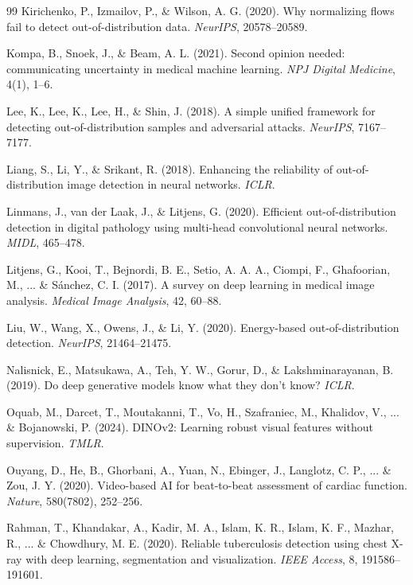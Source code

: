 \documentclass[11pt,a4paper]{article}
\begin{document}
\begin{thebibliography}{99}
Kirichenko, P., Izmailov, P., \& Wilson, A. G. (2020).
Why normalizing flows fail to detect out-of-distribution data.
\textit{NeurIPS}, 20578--20589.

Kompa, B., Snoek, J., \& Beam, A. L. (2021).
Second opinion needed: communicating uncertainty in medical machine learning.
\textit{NPJ Digital Medicine}, 4(1), 1--6.

Lee, K., Lee, K., Lee, H., \& Shin, J. (2018).
A simple unified framework for detecting out-of-distribution samples and adversarial attacks.
\textit{NeurIPS}, 7167--7177.

Liang, S., Li, Y., \& Srikant, R. (2018).
Enhancing the reliability of out-of-distribution image detection in neural networks.
\textit{ICLR}.

Linmans, J., van der Laak, J., \& Litjens, G. (2020).
Efficient out-of-distribution detection in digital pathology using multi-head convolutional neural networks.
\textit{MIDL}, 465--478.

Litjens, G., Kooi, T., Bejnordi, B. E., Setio, A. A. A., Ciompi, F., Ghafoorian, M., ... \& S\'{a}nchez, C. I. (2017).
A survey on deep learning in medical image analysis.
\textit{Medical Image Analysis}, 42, 60--88.

Liu, W., Wang, X., Owens, J., \& Li, Y. (2020).
Energy-based out-of-distribution detection.
\textit{NeurIPS}, 21464--21475.

Nalisnick, E., Matsukawa, A., Teh, Y. W., Gorur, D., \& Lakshminarayanan, B. (2019).
Do deep generative models know what they don't know?
\textit{ICLR}.

Oquab, M., Darcet, T., Moutakanni, T., Vo, H., Szafraniec, M., Khalidov, V., ... \& Bojanowski, P. (2024).
DINOv2: Learning robust visual features without supervision.
\textit{TMLR}.

Ouyang, D., He, B., Ghorbani, A., Yuan, N., Ebinger, J., Langlotz, C. P., ... \& Zou, J. Y. (2020).
Video-based AI for beat-to-beat assessment of cardiac function.
\textit{Nature}, 580(7802), 252--256.

Rahman, T., Khandakar, A., Kadir, M. A., Islam, K. R., Islam, K. F., Mazhar, R., ... \& Chowdhury, M. E. (2020).
Reliable tuberculosis detection using chest X-ray with deep learning, segmentation and visualization.
\textit{IEEE Access}, 8, 191586--191601.


\end{thebibliography}
\end{document}
